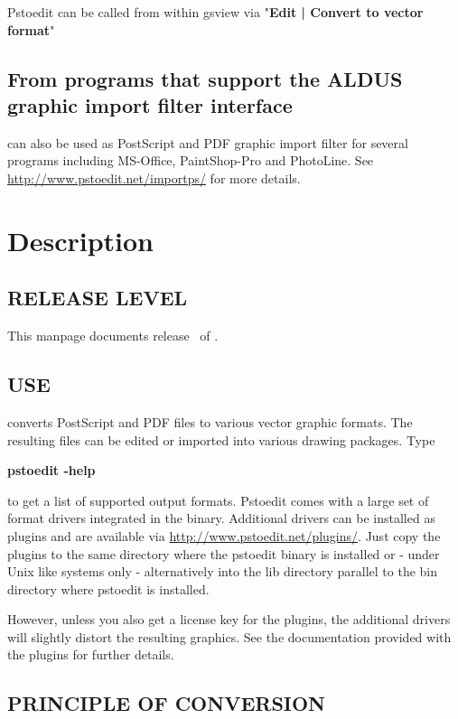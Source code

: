 \documentclass[english,a4paper]{article}
\let\URL\url \let\Email\url \let\File\url
\begin{document}
Pstoedit can be called from within gsview via 
"\textbf{Edit | Convert to vector format}"

\subsection{From programs that support the ALDUS graphic import filter interface}
  
 can also be used as PostScript and PDF graphic import filter for several programs including
MS-Office,  PaintShop-Pro and PhotoLine. See 
\URL{http://www.pstoedit.net/importps/} for more 
details.

 
\section{Description}

\subsection{RELEASE LEVEL}

This manpage documents release \Version\ of . 

\subsection{USE}

 converts PostScript and PDF files to various vector graphic
formats. The resulting files can be edited or imported into various drawing
packages. Type 

     \textbf{pstoedit -help} 
     
\noindent to get a list of supported output formats. Pstoedit comes with a
large set of format drivers integrated in the binary. Additional drivers can be
installed as plugins and are available via 
\URL{http://www.pstoedit.net/plugins/}. 
Just copy the plugins to the same directory where the pstoedit binary is installed or - under Unix like systems only - alternatively into the lib directory parallel to the bin directory where pstoedit is installed.

However, unless you also get a license key for the plugins, the additional
drivers will slightly distort the resulting graphics. See the documentation
provided with the plugins for further details.

\subsection{PRINCIPLE OF CONVERSION}
\end{document}
